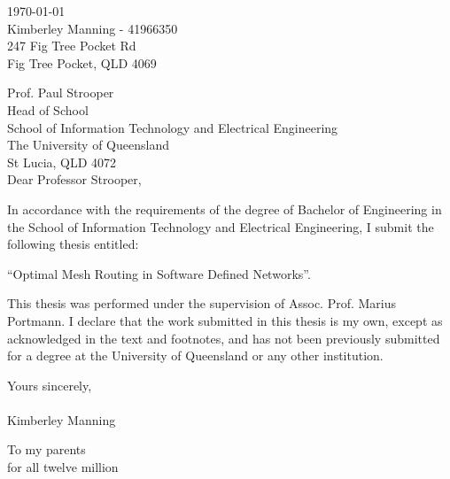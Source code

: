 \begin{flushright}
        \today\\
        Kimberley Manning - 41966350\\
        247 Fig Tree Pocket Rd\\
        Fig Tree Pocket, QLD 4069\\
        \medskip

\end{flushright}
\begin{flushleft}
  Prof. Paul Strooper\\
  Head of School\\
  School of Information Technology and Electrical Engineering\\
  The University of Queensland\\
  St Lucia, QLD 4072\\
  \bigskip\bigskip
  Dear Professor Strooper,\\
\end{flushleft}
In accordance with the requirements of the degree of Bachelor of Engineering in the School of Information Technology and Electrical Engineering, I submit the following thesis entitled:
\begin{center}
        ``Optimal Mesh Routing in Software Defined Networks''.\\
\end{center}
This thesis was performed under the supervision of Assoc. Prof. Marius Portmann. I declare that the work submitted in this thesis is my own, except as acknowledged in the text and footnotes, and has not been previously submitted for a degree at the University of Queensland or any other institution.



\begin{flushleft}
        \medskip
        Yours sincerely,\\
        \bigskip
        \emph\\
        \bigskip
    Kimberley Manning
\end{flushleft}

\cleardoublepage
\vspace*{70mm}
\begin{center}
\renewcommand{\baselinestretch}{1.0}
\sl


         To my parents \\
		for all twelve million


\end{center}

